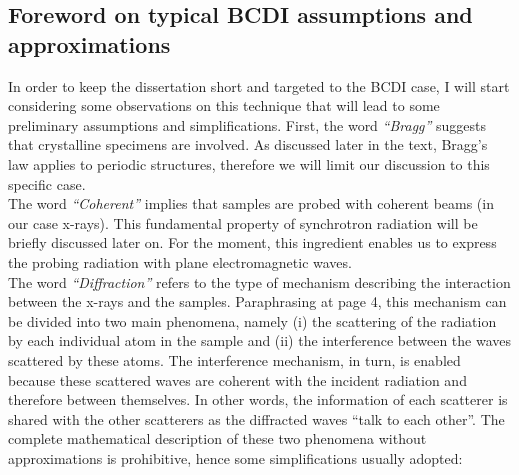 \subsection{Foreword on typical BCDI assumptions and approximations}
In order to keep the dissertation short and targeted to the BCDI case, I will start considering some observations on this
technique that will lead to some preliminary assumptions and simplifications. First, the word \textit{``Bragg''} suggests that 
crystalline specimens are involved. As discussed later in the text, Bragg's law applies to periodic structures, therefore 
we will limit our discussion to this specific case. \\
The word \textit{``Coherent''} implies that samples are probed with coherent beams (in our case x-rays). This fundamental property of 
synchrotron radiation will be briefly discussed later on. For the moment, this ingredient enables us to express the 
probing radiation with plane electromagnetic waves. \\
The word \textit{``Diffraction''} refers to the type of mechanism describing the interaction between the x-rays and the 
samples. Paraphrasing \cite{guinier1994} at page 4, this mechanism can be divided into two main phenomena, namely (i) 
the scattering of the radiation by each individual atom in the sample and (ii) the interference between the waves scattered 
by these atoms. The interference mechanism, in turn, is enabled because these scattered waves are coherent with the incident 
radiation and therefore between themselves. In other words, the information of each scatterer is shared with the other scatterers 
as the diffracted waves ``talk to each other''. The complete mathematical description of these two phenomena without approximations 
is prohibitive, hence some simplifications usually adopted: 
